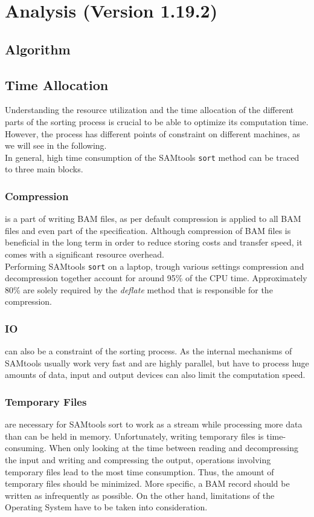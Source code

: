 \section{Analysis (Version 1.19.2)}

\subsection{Algorithm}

\FloatBarrier

\subsection{Time Allocation}
Understanding the resource utilization and the time allocation of the different parts of the sorting process is crucial to be able to optimize its computation time. However, the process has different points of constraint on different machines, as we will see in the following. \\
In general, high time consumption of the SAMtools \texttt{sort} method can be traced to three main blocks.

\subsubsection{Compression} is a part of writing BAM files, as per default compression is applied to all BAM files and even part of the specification. Although compression of BAM files is beneficial in the long term in order to reduce storing costs and transfer speed, it comes with a significant resource overhead. \\
Performing SAMtools \texttt{sort} on a laptop, trough various settings compression and decompression together account for around 95\% of the CPU time. Approximately 80\% are solely required by the \textit{deflate} method that is responsible for the compression.

\subsubsection{IO} can also be a constraint of the sorting process. As the internal mechanisms of SAMtools usually work very fast and are highly parallel, but have to process huge amounts of data, input and output devices can also limit the computation speed.

\subsubsection{Temporary Files} are necessary for SAMtools sort to work as a stream while processing more data than can be held in memory. Unfortunately, writing temporary files is time-consuming. When only looking at the time between reading and decompressing the input and writing and compressing the output, operations involving temporary files lead to the most time consumption. Thus, the amount of temporary files should be minimized. More specific, a BAM record should be written as infrequently as possible. On the other hand, limitations of the Operating System have to be taken into consideration.

